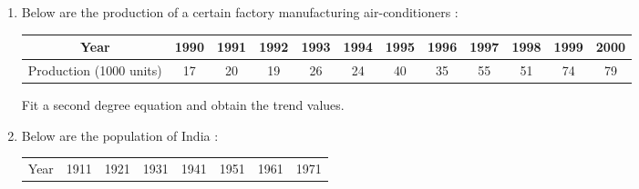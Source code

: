\documentclass[11pt, a4paper]{article}
\begin{document}
\begin{enumerate}
	
	
	
	
	
	
	
	
	
	
	
	\item Below are the production of a certain factory manufacturing air-conditioners :
	
	\begin{table}[h]
	\def\arraystretch{1.5}
	
	\begin{center}
	
	\begin{tabular}{|c||c|c|c|c|c|c|c|c|c|c|c|}
	
	\hline
	
	Year & 1990 & 1991 & 1992 & 1993 & 1994 & 1995 & 1996 & 1997 & 1998 & 1999 & 2000 \\
	
	\hline
	
	Production (1000 units) & 17 & 20 & 19 & 26 & 24 & 40 & 35 & 55 & 51 & 74 & 79 \\
	
	\hline
	
	\end{tabular}
	\end{center}
	
	\end{table}
	
	Fit a second degree equation and obtain the trend values.
	
	
	
	
	
	
	
	
	
\vspace{2cm}










	\item Below are the population of India :
	
	\begin{table}[h]
	\def\arraystretch{1.5}
	
	\begin{center}
	\begin{tabular}{|c||c|c|c|c|c|c|c|}
	
	\hline
	
	Year & 1911 & 1921 & 1931 & 1941 & 1951 & 1961 & 1971 \\
	

\end{tabular}
\end{center}
\end{table}
\end{enumerate}
\end{document}
